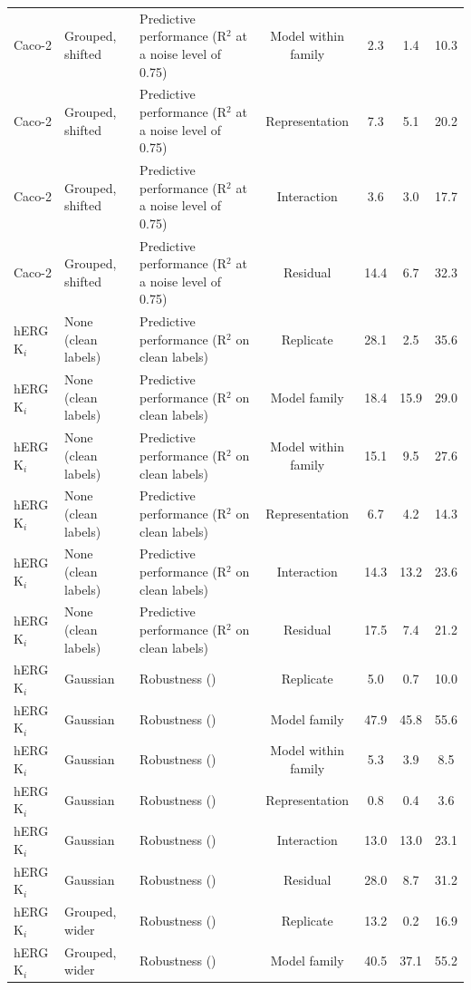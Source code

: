 \begin{landscape}
{\begin{longtable}{lllcccc}
Caco-2 & Grouped, shifted & Predictive performance (R$^2$ at a noise level of 0.75) & Model within family & 2.3 & 1.4 & 10.3 \\
Caco-2 & Grouped, shifted & Predictive performance (R$^2$ at a noise level of 0.75) & Representation & 7.3 & 5.1 & 20.2 \\
Caco-2 & Grouped, shifted & Predictive performance (R$^2$ at a noise level of 0.75) & Interaction & 3.6 & 3.0 & 17.7 \\
Caco-2 & Grouped, shifted & Predictive performance (R$^2$ at a noise level of 0.75) & Residual & 14.4 & 6.7 & 32.3 \\
hERG K$_i$ & None (clean labels) & Predictive performance (R$^2$ on clean labels) & Replicate & 28.1 & 2.5 & 35.6 \\
hERG K$_i$ & None (clean labels) & Predictive performance (R$^2$ on clean labels) & Model family & 18.4 & 15.9 & 29.0 \\
hERG K$_i$ & None (clean labels) & Predictive performance (R$^2$ on clean labels) & Model within family & 15.1 & 9.5 & 27.6 \\
hERG K$_i$ & None (clean labels) & Predictive performance (R$^2$ on clean labels) & Representation & 6.7 & 4.2 & 14.3 \\
hERG K$_i$ & None (clean labels) & Predictive performance (R$^2$ on clean labels) & Interaction & 14.3 & 13.2 & 23.6 \\
hERG K$_i$ & None (clean labels) & Predictive performance (R$^2$ on clean labels) & Residual & 17.5 & 7.4 & 21.2 \\
hERG K$_i$ & Gaussian & Robustness (\aucnorm{}) & Replicate & 5.0 & 0.7 & 10.0 \\
hERG K$_i$ & Gaussian & Robustness (\aucnorm{}) & Model family & 47.9 & 45.8 & 55.6 \\
hERG K$_i$ & Gaussian & Robustness (\aucnorm{}) & Model within family & 5.3 & 3.9 & 8.5 \\
hERG K$_i$ & Gaussian & Robustness (\aucnorm{}) & Representation & 0.8 & 0.4 & 3.6 \\
hERG K$_i$ & Gaussian & Robustness (\aucnorm{}) & Interaction & 13.0 & 13.0 & 23.1 \\
hERG K$_i$ & Gaussian & Robustness (\aucnorm{}) & Residual & 28.0 & 8.7 & 31.2 \\
hERG K$_i$ & Grouped, wider & Robustness (\aucnorm{}) & Replicate & 13.2 & 0.2 & 16.9 \\
hERG K$_i$ & Grouped, wider & Robustness (\aucnorm{}) & Model family & 40.5 & 37.1 & 55.2 \\

\end{longtable}}
\end{landscape}
